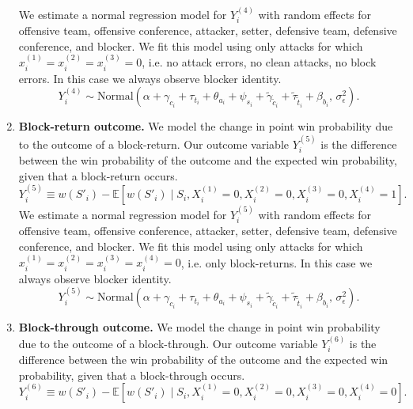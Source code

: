\documentclass[USenglish]{article}
\theoremstyle{dgthm}
\theoremstyle{dgdef}
\begin{document}
\begin{enumerate}
        We estimate a normal regression model for $Y_i^{(4)}$ with random effects for offensive team, offensive conference, attacker, setter, defensive team, defensive conference, and blocker. We fit this model using only attacks for which $x_i^{(1)} = x_i^{(2)} = x_i^{(3)} = 0$, i.e. no attack errors, no clean attacks, no block errors. In this case we always observe blocker identity.
        \begin{equation}
        \label{eqn:attack-model-4}
            Y_i^{(4)} \sim \mbox{Normal}\left(
                \alpha + \gamma_{c_i} + \tau_{t_i} + \theta_{a_i} + \psi_{s_i} + \tilde\gamma_{\tilde c_i} + \tilde\tau_{\tilde t_i} + \beta_{b_i},\,
                \sigma^2_\epsilon
            \right).
        \end{equation}
    \item
        {\bf Block-return outcome.} We model the change in point win probability due to the outcome of a block-return. Our outcome variable $Y_i^{(5)}$ is the difference between the win probability of the outcome and the expected win probability, given that a block-return occurs.
        \begin{equation*}
            Y_i^{(5)} \equiv w(S'_i) - \mathbb{E}\left[w(S'_i) \mid S_i, X_i^{(1)} = 0, X_i^{(2)} = 0, X_i^{(3)} = 0, X_i^{(4)} = 1\right].
        \end{equation*}
        We estimate a normal regression model for $Y_i^{(5)}$ with random effects for offensive team, offensive conference, attacker, setter, defensive team, defensive conference, and blocker. We fit this model using only attacks for which $x_i^{(1)} = x_i^{(2)} = x_i^{(3)} = x_i^{(4)} = 0$, i.e. only block-returns. In this case we always observe blocker identity.
        \begin{equation}
        \label{eqn:attack-model-5}
            Y_i^{(5)} \sim \mbox{Normal}\left(
                \alpha + \gamma_{c_i} + \tau_{t_i} + \theta_{a_i} + \psi_{s_i} + \tilde\gamma_{\tilde c_i} + \tilde\tau_{\tilde t_i} + \beta_{b_i},\,
                \sigma^2_\epsilon
            \right).
        \end{equation}
    \item
        {\bf Block-through outcome.} We model the change in point win probability due to the outcome of a block-through. Our outcome variable $Y_i^{(6)}$ is the difference between the win probability of the outcome and the expected win probability, given that a block-through occurs.
        \begin{equation*}
            Y_i^{(6)} \equiv w(S'_i) - \mathbb{E}\left[w(S'_i) \mid S_i, X_i^{(1)} = 0, X_i^{(2)} = 0, X_i^{(3)} = 0, X_i^{(4)} = 0\right].

\end{equation*}
\end{enumerate}
\end{document}
